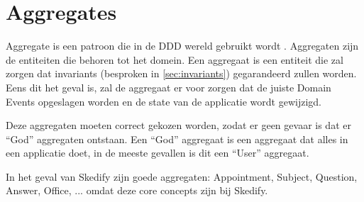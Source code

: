 
\section{Aggregates}
\label{sec:aggregates}

Aggregate is een patroon die in de \gls{DDD} wereld gebruikt wordt \autocite{FowlerAggregate}. Aggregaten zijn de entiteiten die behoren tot het domein. Een aggregaat is een entiteit die zal zorgen dat invariants (besproken in \ref{sec:invariants}) gegarandeerd zullen worden. Eens dit het geval is, zal de aggregaat er voor zorgen dat de juiste Domain Events opgeslagen worden en de state van de applicatie wordt gewijzigd.

Deze aggregaten moeten correct gekozen worden, zodat er geen gevaar is dat er ``God'' aggregaten ontstaan. Een ``God'' aggregaat is een aggregaat dat alles in een applicatie doet, in de meeste gevallen is dit een ``User'' aggregaat.

In het geval van Skedify zijn goede aggregaten: Appointment, Subject, Question, Answer, Office, ... omdat deze core concepts zijn bij Skedify.